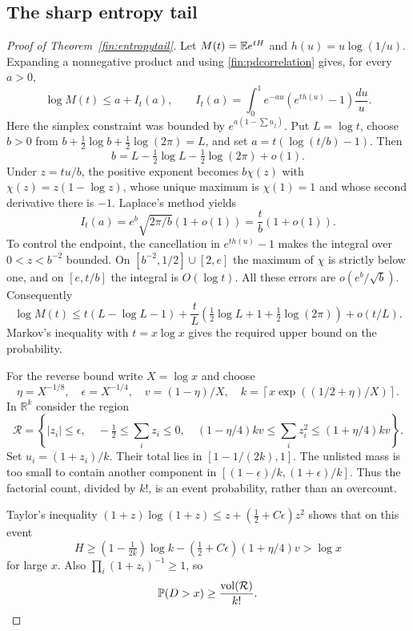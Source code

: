 \subsection{The sharp entropy tail}\label{finapp:entropy-tail}
\begin{proof}[Proof of Theorem~\ref{fin:entropytail}]

Let $M(t)=\mathbb E e^{tH}$ and $h(u)=u\log(1/u)$.
Expanding a nonnegative product and using
\eqref{fin:pdcorrelation} gives, for every $a>0$,
\[
 \log M(t)\le a+I_t(a),\qquad
 I_t(a)=\int_0^1 e^{-au}(e^{th(u)}-1)\frac{du}{u}.
\]
Here the simplex constraint was bounded by
$e^{a(1-\sum u_j)}$.  Put $L=\log t$, choose $b>0$ from
$b+\tfrac12\log b+\tfrac12\log(2\pi)=L$, and set
$a=t(\log(t/b)-1)$.
Then
\[
 b=L-\tfrac12\log L-\tfrac12\log(2\pi)+o(1).
\]
Under $z=tu/b$, the positive exponent becomes
$b\chi(z)$ with $\chi(z)=z(1-\log z)$, whose unique maximum is $\chi(1)=1$
and whose second derivative there is $-1$.
Laplace's method yields
\[
 I_t(a)=e^b\sqrt{2\pi/b}(1+o(1))
       =\frac tb(1+o(1)).
\]
To control the endpoint, the cancellation in $e^{th(u)}-1$ makes the
integral over $0<z<b^{-2}$ bounded.  On
$[b^{-2},1/2]\cup[2,e]$ the maximum of $\chi$ is strictly below one,
and on $[e,t/b]$ the integral is $O(\log t)$.
All these errors are $o(e^b/\sqrt b)$.
Consequently
\[
 \log M(t)\le t(L-\log L-1)
 +\frac tL\left(\tfrac12\log L+1+\tfrac12\log(2\pi)\right)
 +o(t/L).
\]
Markov's inequality with $t=x\log x$ gives the required upper bound
on the probability.

For the reverse bound write $X=\log x$ and choose
\[
 \eta=X^{-1/8},\quad \epsilon=X^{-1/4},\quad
 v=(1-\eta)/X,\quad
 k=\left\lceil x\exp((1/2+\eta)/X)\right\rceil .
\]
In $\mathbb R^k$ consider the region
\[
 \mathcal R=\left\{ |z_i|\le\epsilon,\quad
  -\tfrac12\le\sum_i z_i\le0,\quad
  (1-\eta/4)kv\le\sum_i z_i^2\le(1+\eta/4)kv\right\}.
\]
Set $u_i=(1+z_i)/k$.  Their total lies in $[1-1/(2k),1]$.
The unlisted mass is too small to contain another component in
$[(1-\epsilon)/k,(1+\epsilon)/k]$.
Thus the factorial count, divided by $k!$, is an event probability,
rather than an overcount.

Taylor's inequality
$(1+z)\log(1+z)\le z+(\tfrac12+C\epsilon)z^2$ shows that on this event
\[
 H\ge(1-\tfrac1{2k})\log k
       -(\tfrac12+C\epsilon)(1+\eta/4)v>\log x
\]
for large $x$.  Also
$\prod_i(1+z_i)^{-1}\ge1$, so
\[
 \mathbb P(D>x)\ge\frac{\operatorname{vol}(\mathcal R)}{k!}.
\]


\end{proof}
